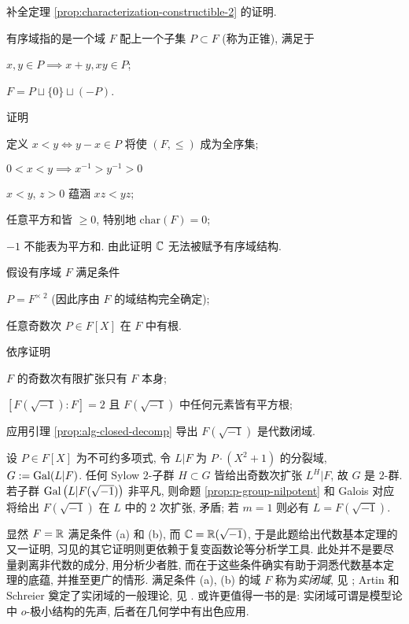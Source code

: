 \begin{Exercises}
	\item 补全定理 \ref{prop:characterization-constructible-2} 的证明.
	\item 有序域指的是一个域 $F$ 配上一个子集 $P \subset F$ (称为正锥), 满足于
		\begin{compactitem}
			\item $x, y \in P \implies x+y, xy \in P$;
			\item $F = P \sqcup \{0\} \sqcup (-P)$.
		\end{compactitem}
		证明
		\begin{compactenum}[(i)]
			\item 定义 $x < y \iff y-x \in P$ 将使 $(F, \leq)$ 成为全序集;
			\item $0 < x < y \implies x^{-1} > y^{-1} > 0$
			\item $x < y$, $z > 0$ 蕴涵 $xz < yz$;
			\item 任意平方和皆 $\geq 0$, 特别地 $\text{char}(F)=0$;
			\item $-1$ 不能表为平方和. 由此证明 $\mathbb{C}$ 无法被赋予有序域结构.
		\end{compactenum}
	\item 假设有序域 $F$ 满足条件
		\begin{inparaenum}[(a)]
			\item $P = F^{\times\; 2}$ (因此序由 $F$ 的域结构完全确定);
			\item 任意奇数次 $P \in F[X]$ 在 $F$ 中有根.
		\end{inparaenum}
		依序证明
		\begin{compactenum}[(i)]
			\item $F$ 的奇数次有限扩张只有 $F$ 本身;
			\item $\left[ F(\sqrt{-1}) : F \right]=2$ 且 $F(\sqrt{-1})$ 中任何元素皆有平方根;
			\item 应用引理 \ref{prop:alg-closed-decomp} 导出 $F(\sqrt{-1})$ 是代数闭域.
		\end{compactenum}
		\begin{hint}
			设 $P \in F[X]$ 为不可约多项式, 令 $L|F$ 为 $P \cdot (X^2+1)$ 的分裂域, $G := \operatorname{Gal}(L|F)$. 任何 Sylow $2$-子群 $H \subset G$ 皆给出奇数次扩张 $L^H | F$, 故 $G$ 是 $2$-群. 若子群 $\operatorname{Gal}\left( L|F(\sqrt{-1})\right)$ 非平凡, 则命题 \ref{prop:p-group-nilpotent} 和 Galois 对应将给出 $F(\sqrt{-1})$ 在 $L$ 中的 $2$ 次扩张, 矛盾; 若 $m=1$ 则必有 $L=F(\sqrt{-1})$.
		\end{hint}

		显然 $F=\mathbb{R}$ 满足条件 (a) 和 (b), 而 $\mathbb{C} = \mathbb{R}(\sqrt{-1})$, 于是此题给出代数基本定理的又一证明, 习见的其它证明则更依赖于复变函数论等分析学工具. 此处并不是要尽量剥离非代数的成分, 用分析少者胜, 而在于这些条件确实有助于洞悉代数基本定理的底蕴, 并推至更广的情形. 满足条件 (a), (b) 的域 $F$ 称为\emph{实闭域}, 见 \cite[第 9 章]{Feng17}; Artin 和 Schreier 奠定了实闭域的一般理论, 见 \cite[Chapter XI]{Lang02}. 或许更值得一书的是: 实闭域可谓是模型论中 $o$-极小结构的先声, 后者在几何学中有出色应用. 
\end{Exercises}
